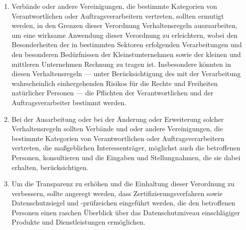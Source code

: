 \begin{enumerate}

   \item Verbände oder andere Vereinigungen, die bestimmte Kategorien von Verantwortlichen oder Auftragsverarbeitern
    vertreten, sollten ermutigt werden, in den Grenzen dieser Verordnung Verhaltensregeln auszuarbeiten, um eine
    wirksame Anwendung dieser Verordnung zu erleichtern, wobei den Besonderheiten der in bestimmten Sektoren
    erfolgenden Verarbeitungen und den besonderen Bedürfnissen der Kleinstunternehmen sowie der kleinen und mittleren
    Unternehmen Rechnung zu tragen ist. Insbesondere könnten in diesen Verhaltensregeln — unter Berücksichtigung des
    mit der Verarbeitung wahrscheinlich einhergehenden Risikos für die Rechte und Freiheiten natürlicher Personen — die
    Pflichten der Verantwortlichen und der Auftragsverarbeiter bestimmt werden.%
   \label{eg:98}
   

   \item Bei der Ausarbeitung oder bei der Änderung oder Erweiterung solcher Verhaltensregeln sollten Verbände und oder
    andere Vereinigungen, die bestimmte Kategorien von Verantwortlichen oder Auftragsverarbeitern vertreten, die
    maßgeblichen Interessenträger, möglichst auch die betroffenen Personen, konsultieren und die Eingaben und
    Stellungnahmen, die sie dabei erhalten, berücksichtigen.%
   \label{eg:99}
   

   \item Um die Transparenz zu erhöhen und die Einhaltung dieser Verordnung zu verbessern, sollte angeregt werden, dass
    Zertifizierungsverfahren sowie Datenschutzsiegel und -prüfzeichen eingeführt werden, die den betroffenen Personen
    einen raschen Überblick über das Datenschutzniveau einschlägiger Produkte und Dienstleistungen ermöglichen.%
   \label{eg:100}
   


\end{enumerate}
